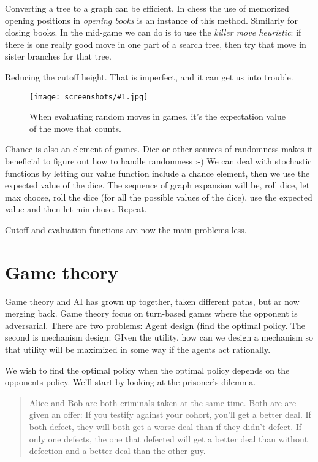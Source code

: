 \documentclass[a4, 12pt, english, USenglish]{scrreprt}
\newcommand{\screenshot}[2]{
\begin{figure}[htb]
\texttt{[image: screenshots/\#1.jpg]}
\label{#1}
\caption{#2}
\end{figure}}
\newcommand{\idx}[1]{{\em #1}\index{#1}}
\begin{document}
Converting a tree to a graph can be efficient. In chess the use of
memorized opening positions in \idx{opening books} is an instance of
this method. Similarly for closing books.   In the mid-game we can do
is to use the \idx{killer move heuristic}: if there is one really good
move in one part of a search tree, then try that move in sister
branches for that tree.

Reducing the cutoff height. That is imperfect, and it can get us into trouble.


\screenshot{chancevalue}{When evaluating random moves in games, it's
  the expectation value of the move that counts.}

Chance is also an element of games.  Dice or other sources of
randomness makes it beneficial to figure out how to handle randomness
:-)  We can deal with stochastic functions by letting our value
function include a chance element, then we use the expected value of
the dice. The sequence of graph expansion will be, roll dice, let max
choose, roll the dice (for all the possible values of the dice), use
the expected value and then let min chose.  Repeat.

Cutoff and evaluation functions are now the main problems less.
 



\chapter{Game theory}

Game theory and AI has grown up together, taken different paths, but
ar now merging back.  Game theory focus on turn-based games where the
opponent is adversarial.  There are two problems:  Agent design (find
the optimal policy.  The second is mechanism design:  GIven the
utility, how can we design a mechanism so that utility will be
maximized in some way if the agents act rationally.

We wish to find the optimal policy when the optimal policy depends on
the opponents policy.  We'll start by looking at the prisoner's
dilemma.

\begin{quote}

Alice and Bob are both criminals taken at the same time.   Both are
are given an offer: If you testify against your cohort, you'll get a
better deal.   If both defect, they will both get a worse deal than if
they didn't defect.  If only one defects, the one that defected will
get a better deal than without defection and a better deal than the
other guy.

\end{quote}
\end{document}
